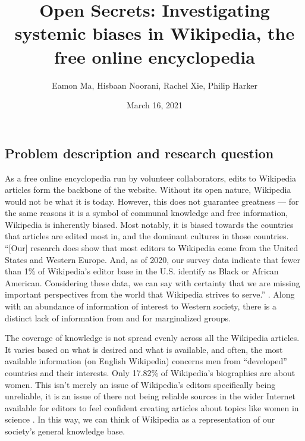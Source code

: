 \documentclass[fontsize=12pt]{article}
\title{Open Secrets: Investigating systemic biases in Wikipedia, the free online encyclopedia}
\author{Eamon Ma, Hisbaan Noorani, Rachel Xie, Philip Harker}
\date{March 16, 2021}
\begin{document}
\maketitle
\begin{multicols}{2}
    \noindent
    
    
    
    \section{Problem description and research question}  %
    
    As a free online encyclopedia run by volunteer collaborators, edits to Wikipedia articles form the backbone of the website. Without its open nature, Wikipedia would not be what it is today. However, this does not guarantee greatness --- for the same reasons it is a symbol of communal knowledge and free information, Wikipedia is inherently biased. Most notably, it is biased towards the countries that articles are edited most in, and the dominant cultures in those countries. ``[Our] research does show that most editors to Wikipedia come from the United States and Western Europe. And, as of 2020, our survey data indicate that fewer than 1\% of Wikipedia’s editor base in the U.S. identify as Black or African American. Considering these data, we can say with certainty that we are missing important perspectives from the world that Wikipedia strives to serve.'' \parencite{Uzzell}. Along with an abundance of information of interest to Western society, there is a distinct lack of information from and for marginalized groups.
    
    The coverage of knowledge is not spread evenly across all the Wikipedia articles. It varies based on what is desired and what is available, and often, the most available information (on English Wikipedia) concerns men from ``developed'' countries and their interests. Only 17.82\% of Wikipedia's biographies are about women. This isn't merely an issue of Wikipedia's editors specifically being unreliable, it is an issue of there not being reliable sources in the wider Internet available for editors to feel confident creating articles about topics like women in science \parencite{Erhart}. In this way, we can think of Wikipedia as a representation of our society's general knowledge base.
    

\end{multicols}
\end{document}
